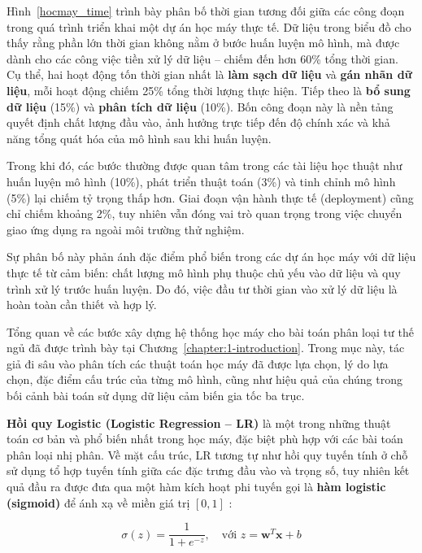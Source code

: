 Hình~\ref{hocmay_time} trình bày phân bố thời gian tương đối giữa các 
công đoạn trong quá trình triển khai một dự án học máy thực tế. 
Dữ liệu trong biểu đồ cho thấy rằng phần lớn thời gian không nằm ở 
bước huấn luyện mô hình, mà được dành cho các công việc tiền xử lý 
dữ liệu – chiếm đến hơn 60\% tổng thời gian.
Cụ thể, hai hoạt động tốn thời gian nhất là \textbf{làm sạch dữ liệu} 
và \textbf{gán nhãn dữ liệu}, mỗi hoạt động chiếm 25\% tổng thời lượng 
thực hiện. Tiếp theo là \textbf{bổ sung dữ liệu} (15\%) và 
\textbf{phân tích dữ liệu} (10\%). Bốn công đoạn này là nền tảng quyết 
định chất lượng đầu vào, ảnh hưởng trực tiếp đến độ chính xác và khả 
năng tổng quát hóa của mô hình sau khi huấn luyện.

Trong khi đó, các bước thường được quan tâm trong các tài liệu học thuật 
như huấn luyện mô hình (10\%), phát triển thuật toán (3\%) và 
tinh chỉnh mô hình (5\%) lại chiếm tỷ trọng thấp hơn. 
Giai đoạn vận hành thực tế (deployment) cũng chỉ chiếm khoảng 2\%, 
tuy nhiên vẫn đóng vai trò quan trọng trong việc chuyển giao ứng dụng 
ra ngoài môi trường thử nghiệm.

Sự phân bố này phản ánh đặc điểm phổ biến trong các dự án học máy với 
dữ liệu thực tế từ cảm biến: chất lượng mô hình phụ thuộc chủ yếu vào 
dữ liệu và quy trình xử lý trước huấn luyện. Do đó, việc đầu tư thời 
gian vào xử lý dữ liệu là hoàn toàn cần thiết và hợp lý.

Tổng quan về các bước xây dựng hệ thống học máy cho bài toán phân loại 
tư thế ngủ đã được trình bày tại Chương~\ref{chapter:1-introduction}.
Trong mục này, tác giả đi sâu vào phân tích các thuật toán học máy 
đã được lựa chọn, lý do lựa chọn, đặc điểm cấu trúc của từng mô hình, 
cũng như hiệu quả của chúng trong bối cảnh bài toán sử dụng dữ liệu 
cảm biến gia tốc ba trục.



\textbf{Hồi quy Logistic (Logistic Regression – LR)} là một trong những thuật toán 
cơ bản và phổ biến nhất trong học máy, đặc biệt phù hợp với các 
bài toán phân loại nhị phân. Về mặt cấu trúc, LR tương tự như hồi 
quy tuyến tính ở chỗ sử dụng tổ hợp tuyến tính giữa các đặc trưng 
đầu vào và trọng số, tuy nhiên kết quả đầu ra được đưa qua một hàm 
kích hoạt phi tuyến gọi là \textbf{hàm logistic (sigmoid)} 
để ánh xạ về miền giá trị $[0, 1]$ \cite{cramer2002logistic}:

\begin{equation}
    \sigma(z) = \frac{1}{1 + e^{-z}}, \quad \text{với } z = \mathbf{w}^T \mathbf{x} + b
\end{equation}

